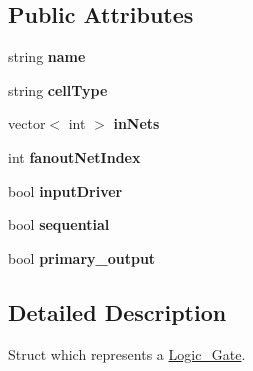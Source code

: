 \subsection*{Public Attributes}
\begin{DoxyCompactItemize}
\item 
\hypertarget{structCircuit__Netlist_1_1Logic__Gate_aa780fa4baf5244fcf34c52053005f73a}{string {\bfseries name}}\label{structCircuit__Netlist_1_1Logic__Gate_aa780fa4baf5244fcf34c52053005f73a}

\item 
\hypertarget{structCircuit__Netlist_1_1Logic__Gate_a3b48b229126233bf5a98f39b003e7e5a}{string {\bfseries cell\-Type}}\label{structCircuit__Netlist_1_1Logic__Gate_a3b48b229126233bf5a98f39b003e7e5a}

\item 
\hypertarget{structCircuit__Netlist_1_1Logic__Gate_a0ada4f530d1846973daed17e35eb10a7}{vector$<$ int $>$ {\bfseries in\-Nets}}\label{structCircuit__Netlist_1_1Logic__Gate_a0ada4f530d1846973daed17e35eb10a7}

\item 
\hypertarget{structCircuit__Netlist_1_1Logic__Gate_ac77535e3e3fff92529fa21d711cd0487}{int {\bfseries fanout\-Net\-Index}}\label{structCircuit__Netlist_1_1Logic__Gate_ac77535e3e3fff92529fa21d711cd0487}

\item 
\hypertarget{structCircuit__Netlist_1_1Logic__Gate_ad08611514342cd0293640fac9eebc61a}{bool {\bfseries input\-Driver}}\label{structCircuit__Netlist_1_1Logic__Gate_ad08611514342cd0293640fac9eebc61a}

\item 
\hypertarget{structCircuit__Netlist_1_1Logic__Gate_a3919c593d1a40b4467d6735be783eee6}{bool {\bfseries sequential}}\label{structCircuit__Netlist_1_1Logic__Gate_a3919c593d1a40b4467d6735be783eee6}

\item 
\hypertarget{structCircuit__Netlist_1_1Logic__Gate_a475c5b2598538600935f66be43c163fa}{bool {\bfseries primary\-\_\-output}}\label{structCircuit__Netlist_1_1Logic__Gate_a475c5b2598538600935f66be43c163fa}

\end{DoxyCompactItemize}


\subsection{Detailed Description}
Struct which represents a \hyperlink{structCircuit__Netlist_1_1Logic__Gate}{Logic\-\_\-\-Gate}. 



